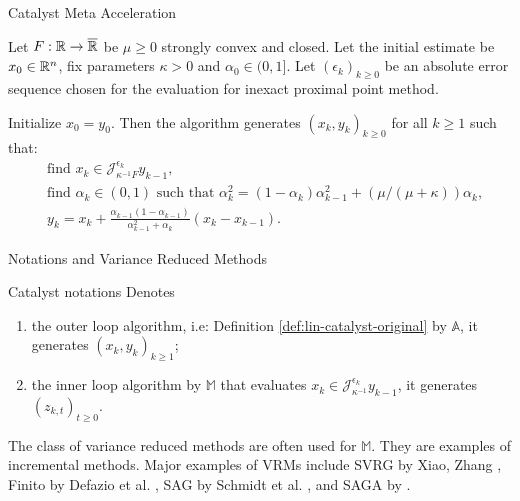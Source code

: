 \documentclass[11pt]{beamer}
\theoremstyle{definition}
\begin{document}
        \begin{frame}{Catalyst Meta Acceleration}
            \begin{definition}\label{def:lin-catalyst-original}
                Let $F:\mathbb R \rightarrow \overline {\mathbb R}$ be $\mu \ge 0$ strongly convex and closed. 
                Let the initial estimate be $x_0 \in \mathbb R^n$, fix parameters $\kappa > 0$ and $\alpha_0 \in (0, 1]$. 
                Let $(\epsilon_k)_{k \ge 0}$ be an absolute error sequence chosen for the evaluation for inexact proximal point method. 
                {\small
                \begin{tcolorbox}
                    Initialize $x_0 = y_0$. Then the algorithm generates $(x_k, y_k)_{k\ge 0}$ for all $k \ge 1$ such that: 
                    \begin{align*}
                        & \text{find } x_k \in \mathcal J_{\kappa^{-1}F}^{\epsilon_k} y_{k - 1}, 
                        \\
                        & \text{find } \alpha_k \in (0, 1) \text{ such that } \alpha_k^2 = (1 - \alpha_k)\alpha_{k - 1}^2 + (\mu/(\mu + \kappa))\alpha_k,
                        \\
                        & 
                        y_{k} = x_k + \frac{\alpha_{k - 1}(1 - \alpha_{k - 1})}{\alpha_{k - 1}^2 + \alpha_k}(x_k - x_{k - 1}). 
                    \end{align*}
                \end{tcolorbox}
                }
            \end{definition}
        \end{frame}
        \begin{frame}{Notations and Variance Reduced Methods}
            \begin{block}{Catalyst notations}
                Denotes
                \begin{enumerate}
                    \item the outer loop algorithm, i.e: Definition \ref{def:lin-catalyst-original} by $\mathbb A$, it generates $(x_k, y_k)_{k \ge 1}$; 
                    \item the inner loop algorithm by $\mathbb M$ that evaluates $x_k \in \mathcal J_{\kappa^{-1}}^{\epsilon_k} y_{k - 1}$, it generates $(z_{k, t})_{t \ge 0}$. 
                \end{enumerate}    
            \end{block}
            The class of variance reduced methods are often used for $\mathbb M$. 
            They are examples of incremental methods. 
            Major examples of VRMs include SVRG by Xiao, Zhang \cite{xiao_proximal_2014}, Finito by Defazio et al. \cite{defazio_finito_2014}, SAG by Schmidt et al. \cite{schmidt_minimizing_2017}, and SAGA by \cite{defazio_saga_2014}. 
        \end{frame}
\end{document}
